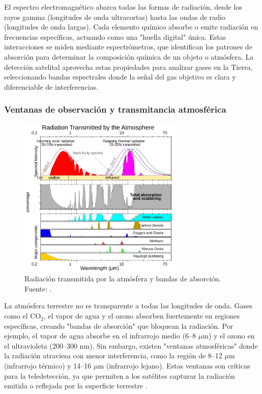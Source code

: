 El espectro electromagnético abarca todas las formas de radiación, desde los rayos gamma (longitudes de onda ultracortas) hasta las ondas de radio (longitudes de onda largas). Cada elemento químico absorbe o emite radiación en frecuencias específicas, actuando como una "huella digital" única. Estas interacciones se miden mediante espectrómetros, que identifican los patrones de absorción para determinar la composición química de un objeto o atmósfera. La detección satelital aprovecha estas propiedades para analizar gases en la Tierra, seleccionando bandas espectrales donde la señal del gas objetivo es clara y diferenciable de interferencias.

\subsubsection{Ventanas de observación y transmitancia atmosférica}
\begin{figure}[H]
    \centering
    \includegraphics[width=0.7\textwidth]{3.Conceptos_Previos/Atmospheric_Transmission-en.jpg} 
    \caption{Radiación transmitida por la atmósfera y bandas de absorción. \\Fuente: \cite{atmospheric_transmission_spectrum}.}
    \label{fig:atm_transmission}
\end{figure}

La atmósfera terrestre no es transparente a todas las longitudes de onda. Gases como el CO$_2$, el vapor de agua y el ozono absorben fuertemente en regiones específicas, creando "bandas de absorción" que bloquean la radiación. Por ejemplo, el vapor de agua absorbe en el infrarrojo medio (6–8 $\mu$m) y el ozono en el ultravioleta (200–300 nm). Sin embargo, existen "ventanas atmosféricas" donde la radiación atraviesa con menor interferencia, como la región de 8–12 $\mu$m (infrarrojo térmico) y 14–16 $\mu$m (infrarrojo lejano). Estas ventanas son críticas para la teledetección, ya que permiten a los satélites capturar la radiación emitida o reflejada por la superficie terrestre \cite{wilber_surface_1999}.

